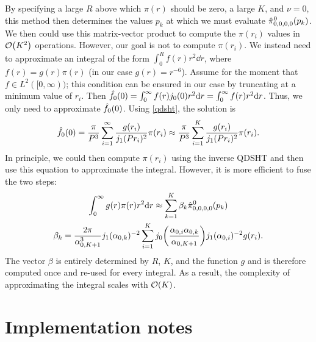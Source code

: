 \documentclass[../../main.tex]{subfiles}
\begin{document}
\begin{refsection}
	By specifying a large $R$ above which $\pi(r)$ should be zero, a large $K$, and $\nu=0$, this method then determines the values $p_k$ at which we must evaluate $\hat{\pi}_{0,0,0,0}^0(p_k)$.
	We then could use this matrix-vector product to compute the $\pi(r_i)$ values in $\order{K^2}$ operations.
	However, our goal is not to compute $\pi(r_i)$.
	We instead need to approximate an integral of the form $\int_0^R f(r) r^2 \dd r$, where $f(r) = g(r) \pi(r)$ (\eg in our case $g(r) = r^{-6}$).
	Assume for the moment that $f \in L^2([0, \infty))$; this condition can be ensured in our case by truncating at a minimum value of $r_i$.
	Then $\hat{f}_0(0) = \int_0^\infty f(r) j_0(0) r^2 \dd r = \int_0^\infty f(r) r^2 \dd r$.
	Thus, we only need to approximate $\hat{f}_0(0)$.
	Using \cref{qdsht}, the solution is
	$$\hat{f}_0(0) = \frac{\pi}{P^3} \sum_{i=1}^\infty \frac{g(r_i)}{j_{1}(P r_i)^2} \pi(r_i) \approx \frac{\pi}{P^3} \sum_{i=1}^K \frac{g(r_i)}{j_{1}(P r_i)^2} \pi(r_i).$$
	In principle, we could then compute $\pi(r_i)$ using the inverse QDSHT and then use this equation to approximate the integral.
	However, it is more efficient to fuse the two steps:
	\begin{equation}
		\begin{gathered}
			\int_0^\infty g(r) \pi(r) r^2 \dd r \approx \sum_{k=1}^K \beta_k \hat{\pi}_{0,0,0,0}^0(p_k) \\
			\beta_k = \frac{2\pi}{\alpha_{0,K+1}^3} j_{1}(\alpha_{0,k})^{-2} \sum_{i=1}^K j_0\qty(\frac{\alpha_{0,i} \alpha_{0,k}}{\alpha_{0,K+1}}) j_{1}(\alpha_{0,i})^{-2} g(r_i).
		\end{gathered}
	\end{equation}
	The vector $\beta$ is entirely determined by $R$, $K$, and the function $g$ and is therefore computed once and re-used for every integral.
	As a result, the complexity of approximating the integral scales with $\order{K}$.

	\section{Implementation notes}


\end{refsection}
\end{document}
